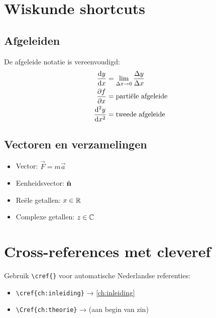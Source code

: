 

\section{Wiskunde shortcuts}

\subsection{Afgeleiden}

De afgeleide notatie is vereenvoudigd:
\begin{align}
    \frac{\mathrm{d} y}{\mathrm{d} x} &= \lim_{\Delta x \to 0} \frac{\Delta y}{\Delta x} \\
    \frac{\partial f}{\partial x} &= \text{partiële afgeleide} \\
    \frac{\mathrm{d}^{2} y}{\mathrm{d} x^{2}} &= \text{tweede afgeleide}
\end{align}

\subsection{Vectoren en verzamelingen}

\begin{itemize}
    \item Vector: $\vec{F} = m\vec{a}$
    \item Eenheidsvector: $\hat{\mathbf{n}}$
    \item Reële getallen: $x \in \mathbb{R}$
    \item Complexe getallen: $z \in \mathbb{C}$
\end{itemize}

\section{Cross-references met cleveref}

Gebruik \verb|\cref{}| voor automatische Nederlandse referenties:
\begin{itemize}
    \item \verb|\cref{ch:inleiding}| → \cref{ch:inleiding}
    \item \verb|\Cref{ch:theorie}| →  (aan begin van zin)
\end{itemize}
